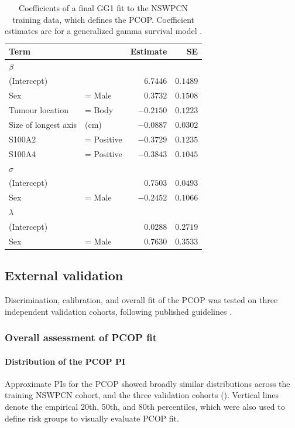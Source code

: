 \documentclass[dissertation.tex]{subfiles}
\begin{document}
\begin{table}
\centering
\caption[Final PCOP fit]{Coefficients of a final GG1 fit to the \gls{NSWPCN} training data, which defines the \gls{PCOP}.  Coefficient estimates are for a generalized gamma survival model \cite{Cox2007}.}\label{tab:nomo-final-fit}
\begin{tabular}{llrr}
\toprule
Term                   &                & Estimate       & SE       \\ \midrule
$\beta$ \\
(Intercept)            &                &  $6.7446$      & $0.1489$ \\
Sex                    & = Male         &  $0.3732$      & $0.1508$ \\
Tumour location        & = Body         & $-0.2150$      & $0.1223$ \\
Size of longest axis   &  (cm)          & $-0.0887$      & $0.0302$ \\
S100A2                 & = Positive     & $-0.3729$      & $0.1235$ \\
S100A4                 & = Positive     & $-0.3843$      & $0.1045$ \\[10]
$\sigma$ \\
(Intercept)            &                &  $0.7503$      & $0.0493$ \\
Sex                    & = Male         & $-0.2452$      & $0.1066$ \\[10]
$\lambda$ \\
(Intercept)            &                &  $0.0288$      & $0.2719$ \\
Sex                    & = Male         &  $0.7630$      & $0.3533$ \\[5] \bottomrule
\end{tabular}
\end{table}


\subsection{External validation}
Discrimination, calibration, and overall fit of the \gls{PCOP} was tested on three independent validation cohorts, following published guidelines \cite{Royston2013}.

\subsubsection{Overall assessment of \acrshort{PCOP} fit}
\paragraph{Distribution of the \acrshort{PCOP} \acrshort{PI}}
Approximate \glspl{PI} for the \gls{PCOP} showed broadly similar distributions across the training \gls{NSWPCN} cohort, and the three validation cohorts ().  Vertical lines denote the empirical 20th, 50th, and 80th percentiles, which were also used to define risk groups to visually evaluate \gls{PCOP} fit.
\end{document}
